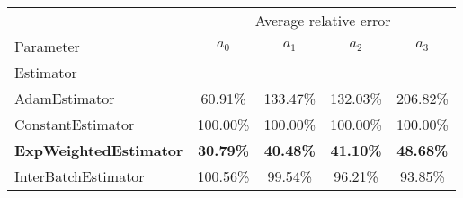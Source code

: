 \begin{tabular}{lcccc}
\toprule
{} & \multicolumn{4}{c}{Average relative error} \\
Parameter &                  $a_0$ &             $a_1$ &             $a_2$ &             $a_3$ \\
Estimator                     &                        &                   &                   &                   \\
\midrule
AdamEstimator                 &                60.91\% &          133.47\% &          132.03\% &          206.82\% \\
ConstantEstimator             &               100.00\% &          100.00\% &          100.00\% &          100.00\% \\
\textbf{ExpWeightedEstimator} &       \textbf{30.79\%} &  \textbf{40.48\%} &  \textbf{41.10\%} &  \textbf{48.68\%} \\
InterBatchEstimator           &               100.56\% &           99.54\% &           96.21\% &           93.85\% \\
\bottomrule
\end{tabular}
